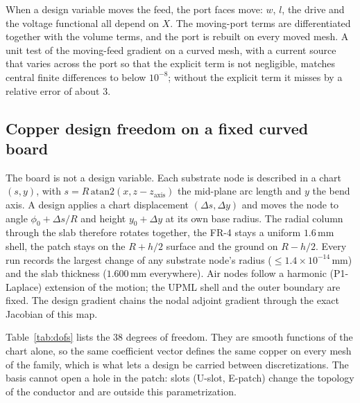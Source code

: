 \documentclass{anvil-paper}
\begin{document}
When a design variable moves the feed, the port faces move: $w$, $l$, the
drive and the voltage functional all depend on $X$. The moving-port terms
are differentiated together with the volume terms, and the port is rebuilt
on every moved mesh. A unit test of the moving-feed gradient on a curved
mesh, with a current source that varies across the port so that the
explicit term is not negligible, matches central finite differences to
below $10^{-8}$; without the explicit term it misses by a relative error
of about $3$.

\subsection{Copper design freedom on a fixed curved board}
\label{sec:freedom}

The board is not a design variable. Each substrate node is described in a
chart $(s, y)$, with $s = R\,\mathrm{atan2}(x, z - z_{\mathrm{axis}})$ the
mid-plane arc length and $y$ the bend axis. A design applies a chart
displacement $(\Delta s, \Delta y)$ and moves the node to angle
$\phi_0 + \Delta s/R$ and height $y_0 + \Delta y$ at its own base radius.
The radial column through the slab therefore rotates together, the FR-4
stays a uniform $1.6$\,mm shell, the patch stays on the $R + h/2$ surface
and the ground on $R - h/2$. Every run records the largest change of any
substrate node's radius ($\le 1.4\times10^{-14}$\,mm) and the slab thickness
($1.600$\,mm everywhere). Air nodes follow a harmonic (P1-Laplace)
extension of the motion; the UPML shell and the outer boundary are fixed.
The design gradient chains the nodal adjoint gradient through the exact
Jacobian of this map.

Table~\ref{tab:dofs} lists the $38$ degrees of freedom. They are smooth
functions of the chart alone, so the same coefficient vector defines the
same copper on every mesh of the family, which is what lets a design be
carried between discretizations. The basis cannot open a hole in the
patch: slots (U-slot, E-patch) change the topology of the conductor and are
outside this parametrization.
\end{document}
